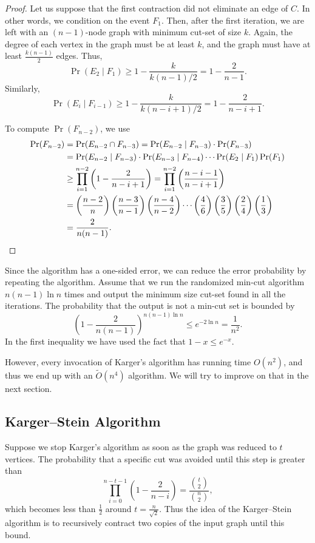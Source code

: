 \begin{proof}
  Let us suppose that the first contraction did not eliminate an edge of $C$. 
  In other words, we condition on the event $F_1$. 
  Then, after the first iteration, we are left with an $(n - 1)$-node graph with
  minimum cut-set of size $k$. 
  Again, the degree of each vertex in the graph must be at least $k$, and the
  graph must have at least $\frac{k(n - 1)}{2}$ edges. 
  Thus,
  \[ \Pr(E_2 \mid F_1) \geq 1 - \frac{k}{k(n-1)/2} = 1 - \frac{2}{n-1}. \]
  Similarly,
  \[ \Pr(E_i \mid F_{i-1}) \geq 1 - \frac{k}{k(n-i+1)/2} = 1 - \frac{2}{n-i+1}. \]
  
  To compute $\Pr(F_{n-2})$, we use
  \begin{align*}
    \Pr(F_{n-2}) &= \Pr(E_{n-2} \cap F_{n-3}) = \Pr(E_{n-2} \mid F_{n-3}) \cdot \Pr(F_{n-3}) \\
                 &= \Pr(E_{n-2} \mid F_{n-3}) \cdot \Pr(E_{n-3} \mid F_{n-4}) \cdots \Pr(E_2 \mid F_1) \Pr(F_1) \\
                 &\geq \prod_{i=1}^{n-2} \left(1 - \frac{2}{n-i+1}\right) = \prod_{i=1}^{n-2} \left(\frac{n-i-1}{n-i+1}\right) \\
                 &= \left(\frac{n-2}{n}\right)\left(\frac{n-3}{n-1}\right)\left(\frac{n-4}{n-2}\right)
                   \cdots \left(\frac{4}{6}\right)\left(\frac{3}{5}\right)\left(\frac{2}{4}\right)\left(\frac{1}{3}\right) \\
                 &= \frac{2}{n(n-1)}.\qedhere
  \end{align*}
\end{proof}

Since the algorithm has a one-sided error, we can reduce the error probability
by repeating the algorithm. 
Assume that we run the randomized min-cut algorithm $n (n - 1) \ln n$ times and
output the minimum size cut-set found in all the iterations. 
The probability that the output is not a min-cut set is bounded by
\[ \left(1 - \frac{2}{n(n-1)}\right)^{n(n-1)\ln n} \leq e^{-2 \ln n} = \frac{1}{n^2}.\]
In the first inequality we have used the fact that $1-x \leq e^{-x}$.

However, every invocation of Karger's algorithm has running time $O(n^2)$, and
thus we end up with an $\widetilde{O}(n^4)$ algorithm. 
We will try to improve on that in the next section.

\subsection{Karger--Stein Algorithm}

Suppose we stop Karger's algorithm as soon as the graph was reduced to $t$ vertices.
The probability that a specific cut was avoided until this step is greater than
\[
\prod_{i=0}^{n-t-1} \left( 1 - \frac{2}{n-i} \right) = \frac {\binom{t}{2}}  {\binom{n}{2}},
\]
which becomes less than $\frac{1}{2}$ around $t = \frac{n}{\sqrt{2}}$.
Thus the idea of the Karger--Stein algorithm is to recursively contract two
copies of the input graph until this bound.



